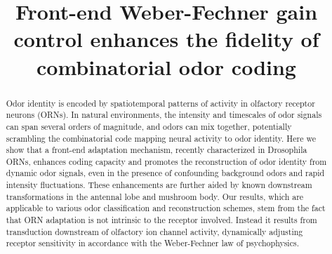 \documentclass[10pt,prl,aps,showpacs,twocolumn,unsortedaddress]{revtex4-1}
\begin{document}
\title{Front-end Weber-Fechner gain control enhances the fidelity of combinatorial odor coding}





\begin{abstract}
    Odor identity is encoded by spatiotemporal patterns of activity in olfactory receptor neurons (ORNs). In natural environments, the intensity and timescales of odor signals can span several orders of magnitude, and odors can mix together, potentially scrambling the combinatorial code mapping neural activity to odor identity. Here we show that a front-end adaptation mechanism, recently characterized in Drosophila ORNs, enhances coding capacity and promotes the reconstruction of odor identity from dynamic odor signals, even in the presence of confounding background odors and rapid intensity fluctuations. These enhancements are further aided by known downstream transformations in the antennal lobe and mushroom body. Our results, which are applicable to various odor classification and reconstruction schemes, stem from the fact that ORN adaptation is not intrinsic to the receptor involved. Instead it results from transduction downstream of olfactory ion channel activity, dynamically adjusting receptor sensitivity in accordance with the Weber-Fechner law of psychophysics. 
    
    
    
\end{abstract}
\end{document}
